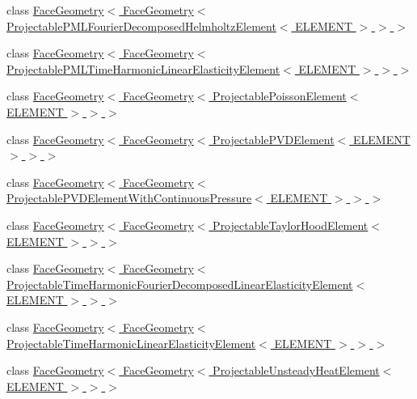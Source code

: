 \begin{DoxyCompactItemize}
\item 
class \hyperlink{classoomph_1_1FaceGeometry_3_01FaceGeometry_3_01ProjectablePMLFourierDecomposedHelmholtzElement_3_01ELEMENT_01_4_01_4_01_4}{Face\+Geometry$<$ Face\+Geometry$<$ Projectable\+P\+M\+L\+Fourier\+Decomposed\+Helmholtz\+Element$<$ E\+L\+E\+M\+E\+N\+T $>$ $>$ $>$}
\item 
class \hyperlink{classoomph_1_1FaceGeometry_3_01FaceGeometry_3_01ProjectablePMLTimeHarmonicLinearElasticityElement_3_01ELEMENT_01_4_01_4_01_4}{Face\+Geometry$<$ Face\+Geometry$<$ Projectable\+P\+M\+L\+Time\+Harmonic\+Linear\+Elasticity\+Element$<$ E\+L\+E\+M\+E\+N\+T $>$ $>$ $>$}
\item 
class \hyperlink{classoomph_1_1FaceGeometry_3_01FaceGeometry_3_01ProjectablePoissonElement_3_01ELEMENT_01_4_01_4_01_4}{Face\+Geometry$<$ Face\+Geometry$<$ Projectable\+Poisson\+Element$<$ E\+L\+E\+M\+E\+N\+T $>$ $>$ $>$}
\item 
class \hyperlink{classoomph_1_1FaceGeometry_3_01FaceGeometry_3_01ProjectablePVDElement_3_01ELEMENT_01_4_01_4_01_4}{Face\+Geometry$<$ Face\+Geometry$<$ Projectable\+P\+V\+D\+Element$<$ E\+L\+E\+M\+E\+N\+T $>$ $>$ $>$}
\item 
class \hyperlink{classoomph_1_1FaceGeometry_3_01FaceGeometry_3_01ProjectablePVDElementWithContinuousPressure_3_01ELEMENT_01_4_01_4_01_4}{Face\+Geometry$<$ Face\+Geometry$<$ Projectable\+P\+V\+D\+Element\+With\+Continuous\+Pressure$<$ E\+L\+E\+M\+E\+N\+T $>$ $>$ $>$}
\item 
class \hyperlink{classoomph_1_1FaceGeometry_3_01FaceGeometry_3_01ProjectableTaylorHoodElement_3_01ELEMENT_01_4_01_4_01_4}{Face\+Geometry$<$ Face\+Geometry$<$ Projectable\+Taylor\+Hood\+Element$<$ E\+L\+E\+M\+E\+N\+T $>$ $>$ $>$}
\item 
class \hyperlink{classoomph_1_1FaceGeometry_3_01FaceGeometry_3_01ProjectableTimeHarmonicFourierDecomposedLinearEld3396eacdc81b6ab8f5f424aa7d5c162}{Face\+Geometry$<$ Face\+Geometry$<$ Projectable\+Time\+Harmonic\+Fourier\+Decomposed\+Linear\+Elasticity\+Element$<$ E\+L\+E\+M\+E\+N\+T $>$ $>$ $>$}
\item 
class \hyperlink{classoomph_1_1FaceGeometry_3_01FaceGeometry_3_01ProjectableTimeHarmonicLinearElasticityElement_3_01ELEMENT_01_4_01_4_01_4}{Face\+Geometry$<$ Face\+Geometry$<$ Projectable\+Time\+Harmonic\+Linear\+Elasticity\+Element$<$ E\+L\+E\+M\+E\+N\+T $>$ $>$ $>$}
\item 
class \hyperlink{classoomph_1_1FaceGeometry_3_01FaceGeometry_3_01ProjectableUnsteadyHeatElement_3_01ELEMENT_01_4_01_4_01_4}{Face\+Geometry$<$ Face\+Geometry$<$ Projectable\+Unsteady\+Heat\+Element$<$ E\+L\+E\+M\+E\+N\+T $>$ $>$ $>$}

\end{DoxyCompactItemize}
